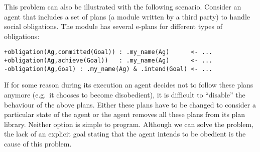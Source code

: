 This problem can also be illustrated with the following
scenario. Consider an agent that includes a set of plans (a module
written by a third party) to handle social obligations. The module has
several e-plans for different types of obligations:
\begin{small}
\begin{verbatim}
+obligation(Ag,committed(Goal)) : .my_name(Ag)      <- ...
+obligation(Ag,achieve(Goal))   : .my_name(Ag)      <- ...
-obligation(Ag,Goal) : .my_name(Ag) & .intend(Goal) <- ...
\end{verbatim}
\end{small}
If for some reason during its execution an agent decides not to follow
these plans anymore (e.g.\ it chooses to become disobedient), it is
difficult to ``disable'' the behaviour of the above plans. Either
these plans have to be changed to consider a particular state of the
agent or the agent removes all these plans from its plan
library. Neither option is simple to
program. %
Although we can solve the problem, the lack of an explicit goal
stating that the agent intends to be obedient is the cause of this
problem.

%
%



